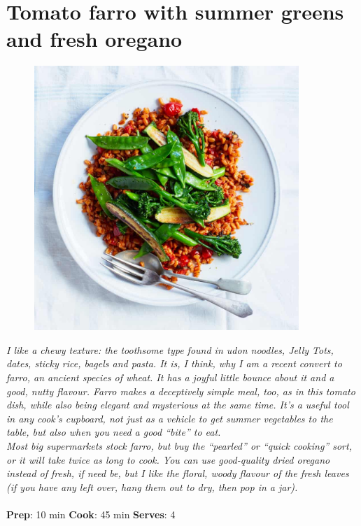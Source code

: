 \documentclass{book}
\begin{document}
\section{Tomato farro with summer greens and fresh oregano}
\begin{figure}
\centering\includegraphics[width=10cm,height=10cm,keepaspectratio]{Recipe_Pictures/Tomato_farro_with_summer_greens_and_fresh_oregano.png}
\end{figure}
\emph{I like a chewy texture: the toothsome type found in udon noodles, Jelly Tots, dates, sticky rice, bagels and pasta. It is, I think, why I am a recent convert to farro, an ancient species of wheat. It has a joyful little bounce about it and a good, nutty flavour. Farro makes a deceptively simple meal, too, as in this tomato dish, while also being elegant and mysterious at the same time. It’s a useful tool in any cook’s cupboard, not just as a vehicle to get summer vegetables to the table, but also when you need a good “bite” to eat.\\ 
Most big supermarkets stock farro, but buy the “pearled” or “quick cooking” sort, or it will take twice as long to cook. You can use good-quality dried oregano instead of fresh, if need be, but I like the floral, woody flavour of the fresh leaves (if you have any left over, hang them out to dry, then pop in a jar).}\\\\ 
\textbf{Prep}: 10 min
\textbf{Cook}: 45 min
\textbf{Serves}: 4
\end{document}

